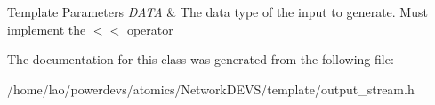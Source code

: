 \begin{DoxyTemplParams}{Template Parameters}
{\em D\+A\+TA} & The data type of the input to generate. Must implement the $<$$<$ operator \\
\hline
\end{DoxyTemplParams}


The documentation for this class was generated from the following file\+:\begin{DoxyCompactItemize}
\item 
/home/lao/powerdevs/atomics/\+Network\+D\+E\+V\+S/template/output\+\_\+stream.\+h\end{DoxyCompactItemize}
